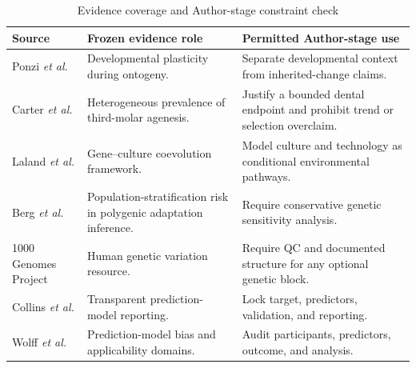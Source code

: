 \documentclass[conference]{IEEEtran}
\begin{document}
\begin{table}[t]
\caption{Evidence coverage and Author-stage constraint check}
\label{tab:coverage}
\centering
\footnotesize
\begin{tabular}{p{}p{}p{}}
\toprule
Source & Frozen evidence role & Permitted Author-stage use \\
\midrule
Ponzi \emph{et al.} \cite{ponzi2020} & Developmental plasticity during ontogeny. & Separate developmental context from inherited-change claims. \\
Carter \emph{et al.} \cite{carter2015} & Heterogeneous prevalence of third-molar agenesis. & Justify a bounded dental endpoint and prohibit trend or selection overclaim. \\
Laland \emph{et al.} \cite{laland2010} & Gene--culture coevolution framework. & Model culture and technology as conditional environmental pathways. \\
Berg \emph{et al.} \cite{berg2019} & Population-stratification risk in polygenic adaptation inference. & Require conservative genetic sensitivity analysis. \\
1000 Genomes Project \cite{auton2015} & Human genetic variation resource. & Require QC and documented structure for any optional genetic block. \\
Collins \emph{et al.} \cite{collins2015} & Transparent prediction-model reporting. & Lock target, predictors, validation, and reporting. \\
Wolff \emph{et al.} \cite{wolff2019} & Prediction-model bias and applicability domains. & Audit participants, predictors, outcome, and analysis. \\
\bottomrule
\end{tabular}
\end{table}
\end{document}
